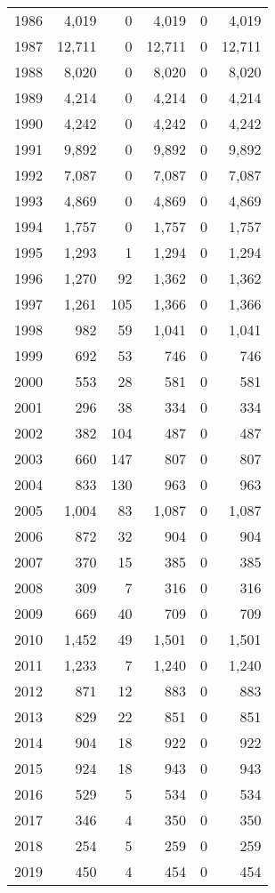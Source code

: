 \documentclass[11pt]{book}
\begin{document}
\begin{longtable}[]{@{}lrrrrr@{}}
1986 & 4,019 & 0 & 4,019 & 0 & 4,019\tabularnewline
1987 & 12,711 & 0 & 12,711 & 0 & 12,711\tabularnewline
1988 & 8,020 & 0 & 8,020 & 0 & 8,020\tabularnewline
1989 & 4,214 & 0 & 4,214 & 0 & 4,214\tabularnewline
1990 & 4,242 & 0 & 4,242 & 0 & 4,242\tabularnewline
1991 & 9,892 & 0 & 9,892 & 0 & 9,892\tabularnewline
1992 & 7,087 & 0 & 7,087 & 0 & 7,087\tabularnewline
1993 & 4,869 & 0 & 4,869 & 0 & 4,869\tabularnewline
1994 & 1,757 & 0 & 1,757 & 0 & 1,757\tabularnewline
1995 & 1,293 & 1 & 1,294 & 0 & 1,294\tabularnewline
1996 & 1,270 & 92 & 1,362 & 0 & 1,362\tabularnewline
1997 & 1,261 & 105 & 1,366 & 0 & 1,366\tabularnewline
1998 & 982 & 59 & 1,041 & 0 & 1,041\tabularnewline
1999 & 692 & 53 & 746 & 0 & 746\tabularnewline
2000 & 553 & 28 & 581 & 0 & 581\tabularnewline
2001 & 296 & 38 & 334 & 0 & 334\tabularnewline
2002 & 382 & 104 & 487 & 0 & 487\tabularnewline
2003 & 660 & 147 & 807 & 0 & 807\tabularnewline
2004 & 833 & 130 & 963 & 0 & 963\tabularnewline
2005 & 1,004 & 83 & 1,087 & 0 & 1,087\tabularnewline
2006 & 872 & 32 & 904 & 0 & 904\tabularnewline
2007 & 370 & 15 & 385 & 0 & 385\tabularnewline
2008 & 309 & 7 & 316 & 0 & 316\tabularnewline
2009 & 669 & 40 & 709 & 0 & 709\tabularnewline
2010 & 1,452 & 49 & 1,501 & 0 & 1,501\tabularnewline
2011 & 1,233 & 7 & 1,240 & 0 & 1,240\tabularnewline
2012 & 871 & 12 & 883 & 0 & 883\tabularnewline
2013 & 829 & 22 & 851 & 0 & 851\tabularnewline
2014 & 904 & 18 & 922 & 0 & 922\tabularnewline
2015 & 924 & 18 & 943 & 0 & 943\tabularnewline
2016 & 529 & 5 & 534 & 0 & 534\tabularnewline
2017 & 346 & 4 & 350 & 0 & 350\tabularnewline
2018 & 254 & 5 & 259 & 0 & 259\tabularnewline
2019 & 450 & 4 & 454 & 0 & 454\tabularnewline
\bottomrule
\end{longtable}
\clearpage
\end{document}
